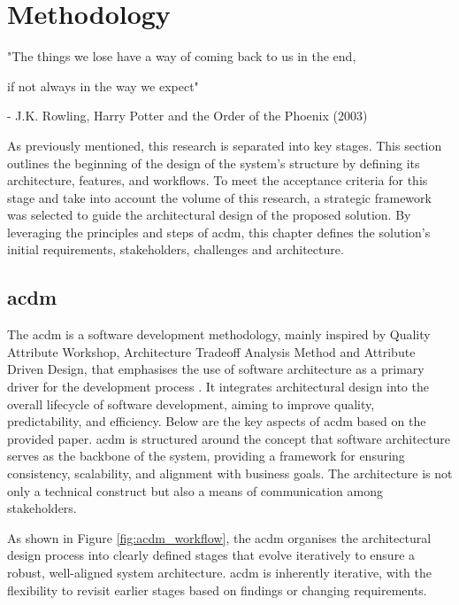 \chapter{Methodology}
\label{chapter:methodology}

\begin{introduction}
"The things we lose have a way of coming back to us in the end,

if not always in the way we expect"

- J.K. Rowling, Harry Potter and the Order of the Phoenix (2003)
\end{introduction}

As previously mentioned, this research is separated into key stages. This section outlines the beginning of the design of the system's structure by defining its architecture, features, and workflows. To meet the acceptance criteria for this stage and take into account the volume of this research, a strategic framework was selected to guide the architectural design of the proposed solution. By leveraging the principles and steps of \ac{acdm}, this chapter defines the solution's initial requirements, stakeholders, challenges and architecture.

\section{\acl{acdm}} \label{section:acdm}

The \ac{acdm} is a software development methodology, mainly inspired by Quality Attribute Workshop, Architecture Tradeoff Analysis Method and Attribute Driven Design, that emphasises the use of software architecture as a primary driver for the development process \cite{Lattanze2005}. It integrates architectural design into the overall lifecycle of software development, aiming to improve quality, predictability, and efficiency. Below are the key aspects of \ac{acdm} based on the provided paper. \ac{acdm} is structured around the concept that software architecture serves as the backbone of the system, providing a framework for ensuring consistency, scalability, and alignment with business goals. The architecture is not only a technical construct but also a means of communication among stakeholders.

As shown in Figure \ref{fig:acdm_workflow}, the \ac{acdm} organises the architectural design process into clearly defined stages that evolve iteratively to ensure a robust, well-aligned system architecture. \ac{acdm} is inherently iterative, with the flexibility to revisit earlier stages based on findings or changing requirements.

